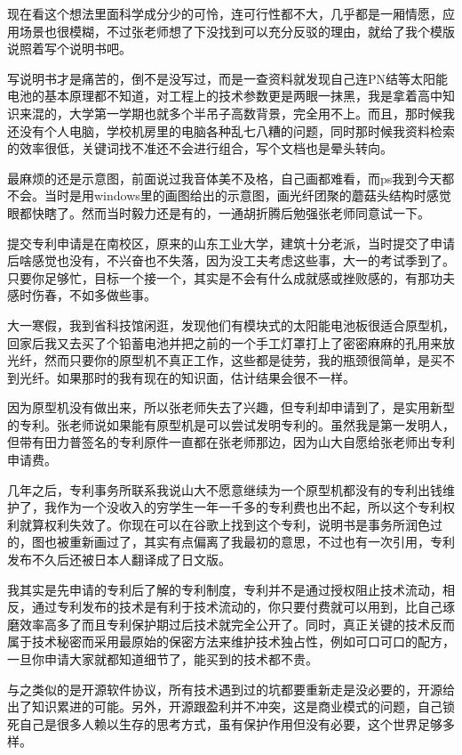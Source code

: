 \documentclass[]{book}
\begin{document}
现在看这个想法里面科学成分少的可怜，连可行性都不大，几乎都是一厢情愿，应用场景也很模糊，不过张老师想了下没找到可以充分反驳的理由，就给了我个模版说照着写个说明书吧。

写说明书才是痛苦的，倒不是没写过，而是一查资料就发现自己连PN结等太阳能电池的基本原理都不知道，对工程上的技术参数更是两眼一抹黑，我是拿着高中知识来混的，大学第一学期也就多个半吊子高数背景，完全用不上。而且，那时候我还没有个人电脑，学校机房里的电脑各种乱七八糟的问题，同时那时候我资料检索的效率很低，关键词找不准还不会进行组合，写个文档也是晕头转向。

最麻烦的还是示意图，前面说过我音体美不及格，自己画都难看，而ps我到今天都不会。当时是用windows里的画图给出的示意图，画光纤团聚的蘑菇头结构时感觉眼都快瞎了。然而当时毅力还是有的，一通胡折腾后勉强张老师同意试一下。

提交专利申请是在南校区，原来的山东工业大学，建筑十分老派，当时提交了申请后啥感觉也没有，不兴奋也不失落，因为没工夫考虑这些事，大一的考试季到了。只要你足够忙，目标一个接一个，其实是不会有什么成就感或挫败感的，有那功夫感时伤春，不如多做些事。

大一寒假，我到省科技馆闲逛，发现他们有模块式的太阳能电池板很适合原型机，回家后我又去买了个铅蓄电池并把之前的一个手工灯罩打上了密密麻麻的孔用来放光纤，然而只要你的原型机不真正工作，这些都是徒劳，我的瓶颈很简单，是买不到光纤。如果那时的我有现在的知识面，估计结果会很不一样。

因为原型机没有做出来，所以张老师失去了兴趣，但专利却申请到了，是实用新型的专利。张老师说如果能有原型机是可以尝试发明专利的。虽然我是第一发明人，但带有田力普签名的专利原件一直都在张老师那边，因为山大自愿给张老师出专利申请费。

几年之后，专利事务所联系我说山大不愿意继续为一个原型机都没有的专利出钱维护了，我作为一个没收入的穷学生一年一千多的专利费也出不起，所以这个专利权利就算权利失效了。你现在可以在谷歌上找到这个专利，说明书是事务所润色过的，图也被重新画过了，其实有点偏离了我最初的意思，不过也有一次引用，专利发布不久后还被日本人翻译成了日文版。

我其实是先申请的专利后了解的专利制度，专利并不是通过授权阻止技术流动，相反，通过专利发布的技术是有利于技术流动的，你只要付费就可以用到，比自己琢磨效率高多了而且专利保护期过后技术就完全公开了。同时，真正关键的技术反而属于技术秘密而采用最原始的保密方法来维护技术独占性，例如可口可口的配方，一旦你申请大家就都知道细节了，能买到的技术都不贵。

与之类似的是开源软件协议，所有技术遇到过的坑都要重新走是没必要的，开源给出了知识累进的可能。另外，开源跟盈利并不冲突，这是商业模式的问题，自己锁死自己是很多人赖以生存的思考方式，虽有保护作用但没有必要，这个世界足够多样。
\end{document}
